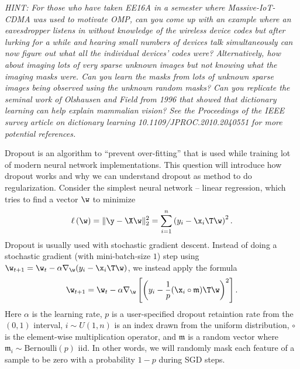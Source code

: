 \documentclass[preview]{standalone}
\begin{document}
\begin{Parts}
        {\em HINT: For those who have taken EE16A in a semester where
          Massive-IoT-CDMA was used to motivate OMP, can you come up with
          an example where an eavesdropper listens in without knowledge of
          the wireless device codes but after lurking for a while and
          hearing small numbers of devices talk simultaneously can now
          figure out what all the individual devices' codes were?
          Alternatively, how about imaging lots of very sparse unknown
          images but not knowing what the imaging masks were. Can you
          learn the masks from lots of unknown sparse images being
          observed using the unknown random masks? Can you replicate
          the seminal work of Olshausen and Field from 1996 that
          showed that dictionary learning can help explain mammalian
          vision? See the Proceedings of the IEEE survey article on
          dictionary learning 10.1109/JPROC.2010.2040551 for more
          potential references.}

							
										
				
				
																							
							
			
		
		
							
		
	
		
				
		
		
								
		
		
\end{Parts}

Dropout is an algorithm to ``prevent over-fitting'' that is used while training lot of modern neural network implementations.  This question will introduce how dropout works and why we can understand dropout as method to do regularization.  Consider the simplest neural network -- linear regression, which tries to find a vector $\w$ to minimize
\begin{equation}
    \ell\left(\w\right) = \lVert \y-\X\w \rVert_2^2 = \sum_{i=1}^n \left(y_i - \x_i\T\w\right)^2.
\end{equation}
Dropout is usually used with stochastic gradient descent.  Instead of
doing a stochastic gradient (with mini-batch-size $1$) step using
$\w_{t+1}=\w_t-\alpha \nabla_{\w} (y_i - \x_i\T\w)$, we instead apply the formula
\begin{equation}
    \w_{t+1}=\w_t - \alpha \nabla_{\w}\left[\left( y_i - \frac{1}{p}(\x_i \circ \mathfrak{m}) \T\w \right)^2\right]. 
\end{equation}
Here $\alpha$ is the learning rate, $p$ is a user-specified dropout
retaintion rate from the $(0,1)$ interval,  $i \sim U(1, n)$ is an
index drawn from the uniform distribution, $\circ$ is the element-wise
multiplication operator, and $\mathfrak{m}$ is a random vector where
$\mathfrak{m}_i \sim \mathrm{Bernoulli}(p)$ iid.  In other words, we
will randomly mask each feature of a sample to be zero with a
probability $1-p$ during SGD steps. 
\end{document}
